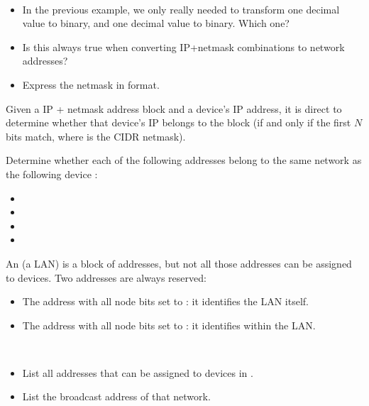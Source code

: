 \begin{exercise}\ \\[-0.5cm]
\begin{itemize}
\item In the previous example, we only really needed to transform one decimal value to binary,
and one decimal value to binary. Which one?
\item Is this always true when converting IP+netmask combinations to network addresses?
\item Express the netmask in  format.
\end{itemize}
\end{exercise}



Given a IP + netmask address block and a device's IP address, it is direct to determine 
whether that device's IP belongs to the block (if and only if the first $N$ bits match,
where  is the CIDR netmask).

\begin{exercise}
Determine whether each of the following addresses belong to the same network as
the following device :
\begin{itemize}
\item {}
\item {}
\item {}
\item {}
\end{itemize}
\end{exercise}

An  (a LAN) is a block of addresses, but not all those addresses 
can be assigned to devices. Two addresses are always reserved:
\begin{itemize}
\item The address with all node bits set to : it identifies the LAN itself.
\item The address with all node bits set to : it identifies  within the LAN.
\end{itemize}

\begin{exercise}\ \\[-0.5cm]
\begin{itemize}
\item List all addresses that can be assigned to devices in .
\item List the broadcast address of that network.
\end{itemize}
\end{exercise}

